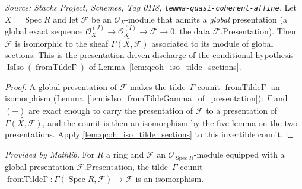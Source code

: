 \begin{lemma}\leanok
  \label{lem:qcoh_iso_tilde_sections_of_presentation}
  \textit{Source: Stacks Project, Schemes, Tag 01I8, \texttt{lemma-quasi-coherent-affine}.}
  Let \(X = \operatorname{Spec} R\) and let \(\mathcal{F}\) be an \(\mathcal{O}_X\)-module that admits
  a \emph{global} presentation (a global exact sequence
  \(\mathcal{O}_X^{(J)} \to \mathcal{O}_X^{(I)} \to \mathcal{F} \to 0\), the data
  \(\mathcal{F}.\mathrm{Presentation}\)). Then \(\mathcal{F}\) is isomorphic to the sheaf
  \(\widetilde{\Gamma(X, \mathcal{F})}\) associated to its module of global sections. This is the
  presentation-driven discharge of the conditional hypothesis
  \(\operatorname{IsIso}(\operatorname{fromTilde\Gamma})\) of Lemma~\ref{lem:qcoh_iso_tilde_sections}.
\end{lemma}
\begin{proof}
  \leanok
  A global presentation of \(\mathcal{F}\) makes the tilde–\(\Gamma\) counit
  \(\operatorname{fromTilde\Gamma}\) an isomorphism
  (Lemma~\ref{lem:isIso_fromTildeGamma_of_presentation}): \(\Gamma\) and \(\widetilde{(-)}\) are exact
  enough to carry the presentation of \(\mathcal{F}\) to a presentation of
  \(\widetilde{\Gamma(X, \mathcal{F})}\), and the counit is then an isomorphism by the five lemma on
  the two presentations. Apply
  \cref{lem:qcoh_iso_tilde_sections} to this invertible counit.
\end{proof}

\begin{lemma}
  \label{lem:isIso_fromTildeGamma_of_presentation}
  \mathlibok
  \textit{Provided by Mathlib.}
  For \(R\) a ring and \(\mathcal{F}\) an \(\mathcal{O}_{\operatorname{Spec} R}\)-module equipped with
  a global presentation \(\mathcal{F}.\mathrm{Presentation}\), the tilde–\(\Gamma\) counit
  \(\operatorname{fromTilde\Gamma} : \widetilde{\Gamma(\operatorname{Spec} R, \mathcal{F})} \to
  \mathcal{F}\) is an isomorphism.
\end{lemma}

